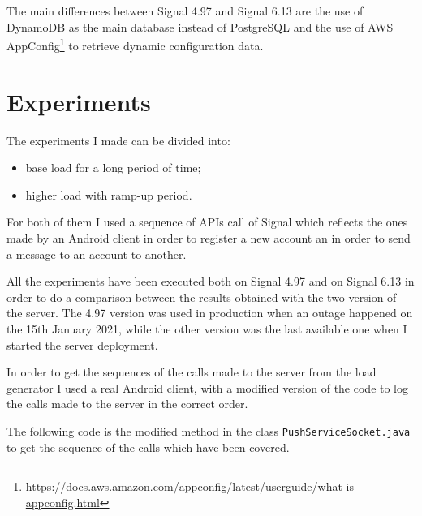 The main differences between Signal 4.97 and Signal 6.13 are the use of DynamoDB as the main database instead of PostgreSQL and the use of AWS AppConfig\footnote{\url{https://docs.aws.amazon.com/appconfig/latest/userguide/what-is-appconfig.html}} to retrieve dynamic configuration data.

\section{Experiments\label{sec:experiments}}

The experiments I made can be divided into:
\begin{itemize}
    \item base load for a long period of time;
    \item higher load with ramp-up period.
\end{itemize}

For both of them I used a sequence of APIs call of Signal which reflects the ones made by an Android client in order to register a new account an in order to send a message to an account to another.

All the experiments have been executed both on Signal 4.97 and on Signal 6.13 in order to do a comparison between the results obtained with the two version of the server.
The 4.97 version was used in production when an outage happened on the 15th January 2021, while the other version was the last available one when I started the server deployment.

In order to get the sequences of the calls made to the server from the load generator I used a real Android client, with a modified version of the code to log the calls made to the server in the correct order.

The following code is the modified method in the class \texttt{PushServiceSocket.java} to get the sequence of the calls which have been covered.

